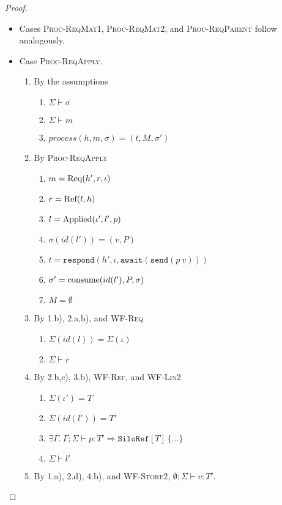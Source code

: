 \begin{proof}
\begin{itemize}
\item Cases \textsc{Proc-ReqMat1}, \textsc{Proc-ReqMat2}, and \textsc{Proc-ReqParent} follow analogously.

\item Case \textsc{Proc-ReqApply}.
\begin{enumerate}
\item By the assumptions
  \begin{enumerate}[label=(\alph*)]
  \item $\Sigma \vdash \sigma$
  \item $\Sigma \vdash m$
  \item $process(h, m, \sigma) = (t, M, \sigma')$
  \end{enumerate}
\item By \textsc{Proc-ReqApply}
  \begin{enumerate}[label=(\alph*)]
  \item $m = {\textrm{Req}(h', r, \iota)}$
  \item $r = {\textrm{Ref}(l, h)}$
  \item $l = {\textrm{Applied}(\iota', l', p)}$
  \item $\sigma(id(l')) = (v, P)$
  \item $t = \texttt{respond}(h', \iota, \texttt{await}(\texttt{send}(p~v)))$
  \item $\sigma' = {\textrm{consume}(id(l'), P, \sigma)}$
  \item $M = \emptyset$
  \end{enumerate}
\item By 1.b), 2.a,b), and \textsc{WF-Req}
  \begin{enumerate}[label=(\alph*)]
  \item $\Sigma(id(l)) = \Sigma(\iota)$
  \item $\Sigma \vdash r$
  \end{enumerate}
\item By 2.b,c), 3.b), \textsc{WF-Ref}, and \textsc{WF-Lin2}
  \begin{enumerate}[label=(\alph*)]
  \item $\Sigma(\iota') = T$
  \item $\Sigma(id(l')) = T'$
  \item $\exists \Gamma.~\Gamma ; \Sigma \vdash p : T' \Rightarrow \texttt{SiloRef}[T]~\{\ldots\}$
  \item $\Sigma \vdash l'$
  \end{enumerate}
\item By 1.a), 2.d), 4.b), and \textsc{WF-Store2}, $\emptyset ; \Sigma \vdash v : T'$.

\end{enumerate}
\end{itemize}
\end{proof}
